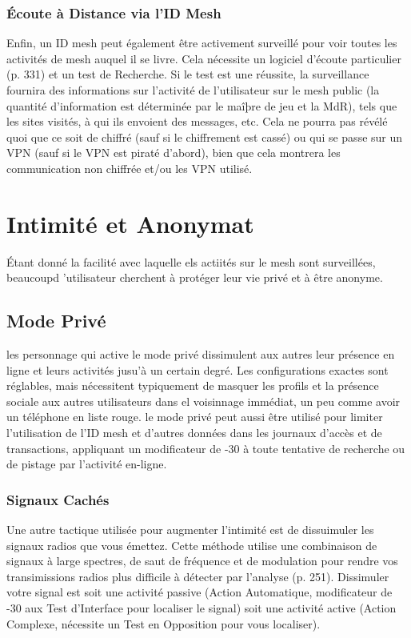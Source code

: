 \subsubsection{Écoute à Distance via l'ID Mesh} 

Enfin, un ID mesh peut également être activement surveillé pour voir toutes les activités de mesh auquel il se livre. Cela nécessite un logiciel d'écoute particulier (p. 331) et un test de Recherche. Si le test est une réussite, la surveillance fournira des informations sur l'activité de l'utilisateur sur le mesh public (la quantité d'information est déterminée par le maîþre de jeu et la MdR), tels que les sites visités, à qui ils envoient des messages, etc. Cela ne pourra pas révélé quoi que ce soit de chiffré (sauf si le chiffrement est cassé) ou qui se passe sur un VPN (sauf si le VPN est piraté d'abord), bien que cela montrera les communication non chiffrée et/ou les VPN utilisé. 

\section{Intimité et Anonymat} 

Étant donné la facilité avec laquelle els actiités sur le mesh sont surveillées, beaucoupd 'utilisateur cherchent à protéger leur vie privé et à être anonyme. 

\subsection{Mode Privé} 

les personnage qui active le mode privé dissimulent aux autres leur présence en ligne et leurs activités jusu'à un certain degré. Les configurations exactes sont réglables, mais nécessitent typiquement de masquer les profils et la présence sociale aux autres utilisateurs dans el voisinnage immédiat, un peu comme avoir un téléphone en liste rouge. le mode privé peut aussi être utilisé pour limiter l'utilisation de l'ID mesh et d'autres données dans les journaux d'accès et de transactions, appliquant un modificateur de -30 à toute tentative de recherche ou de pistage par l'activité en-ligne. 

\subsubsection{Signaux Cachés} 

Une autre tactique utilisée pour augmenter l'intimité est de dissuimuler les signaux radios que vous émettez. Cette méthode utilise une combinaison de signaux à large spectres, de saut de fréquence et de modulation pour rendre vos transimissions radios plus difficile à  détecter par l'analyse (p. 251). Dissimuler votre signal est soit une activité passive (Action Automatique, modificateur de -30 aux Test d'Interface pour localiser le signal) soit une activité active (Action Complexe, nécessite  un Test en Opposition pour vous localiser). 

